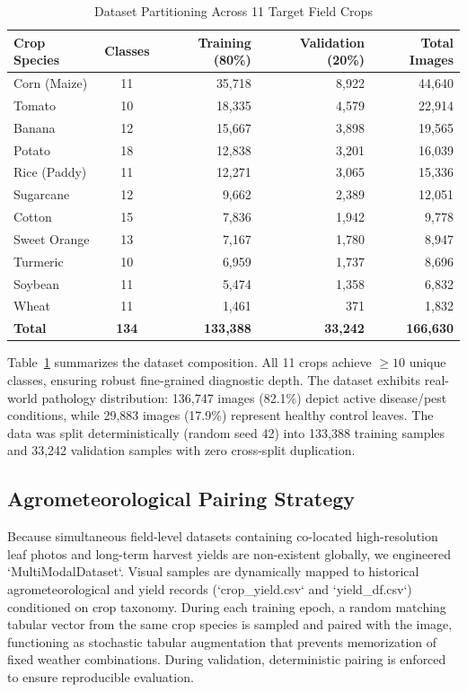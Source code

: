 \documentclass[conference]{IEEEtran}
\begin{document}
\begin{table}[t]
\centering
\caption{Dataset Partitioning Across 11 Target Field Crops}
\label{tab:crops_dataset}
\begin{tabular}{@{}lcrrr@{}}
\toprule
\textbf{Crop Species} & \textbf{Classes} & \textbf{Training (80\%)} & \textbf{Validation (20\%)} & \textbf{Total Images} \\
\midrule
Corn (Maize)   & 11  & 35,718  & 8,922  & 44,640 \\
Tomato         & 10  & 18,335  & 4,579  & 22,914 \\
Banana         & 12  & 15,667  & 3,898  & 19,565 \\
Potato         & 18  & 12,838  & 3,201  & 16,039 \\
Rice (Paddy)   & 11  & 12,271  & 3,065  & 15,336 \\
Sugarcane      & 12  &  9,662  & 2,389  & 12,051 \\
Cotton         & 15  &  7,836  & 1,942  &  9,778 \\
Sweet Orange   & 13  &  7,167  & 1,780  &  8,947 \\
Turmeric       & 10  &  6,959  & 1,737  &  8,696 \\
Soybean        & 11  &  5,474  & 1,358  &  6,832 \\
Wheat          & 11  &  1,461  &   371  &  1,832 \\
\midrule
\textbf{Total} & \textbf{134} & \textbf{133,388} & \textbf{33,242} & \textbf{166,630} \\
\bottomrule
\end{tabular}
\end{table}

Table~\ref{tab:crops_dataset} summarizes the dataset composition. All 11 crops achieve $\ge 10$ unique classes, ensuring robust fine-grained diagnostic depth. The dataset exhibits real-world pathology distribution: 136,747 images (82.1\%) depict active disease/pest conditions, while 29,883 images (17.9\%) represent healthy control leaves. The data was split deterministically (random seed 42) into 133,388 training samples and 33,242 validation samples with zero cross-split duplication.

\subsection{Agrometeorological Pairing Strategy}
Because simultaneous field-level datasets containing co-located high-resolution leaf photos and long-term harvest yields are non-existent globally, we engineered `MultiModalDataset`. Visual samples are dynamically mapped to historical agrometeorological and yield records (`crop_yield.csv` and `yield_df.csv`) conditioned on crop taxonomy. During each training epoch, a random matching tabular vector from the same crop species is sampled and paired with the image, functioning as stochastic tabular augmentation that prevents memorization of fixed weather combinations. During validation, deterministic pairing is enforced to ensure reproducible evaluation.
\end{document}
